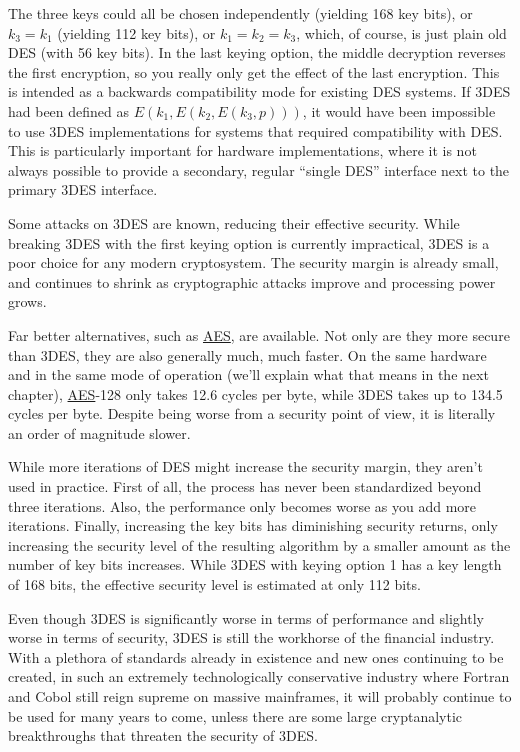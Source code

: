 \documentclass[11pt,ebook,table,dvipsnames]{memoir}
\begin{document}
The three keys could all be chosen independently (yielding 168 key
bits), or $k_3 = k_1$ (yielding 112 key bits), or $k_1 = k_2 = k_3$,
which, of course, is just plain old DES (with 56 key bits). In the
last keying option, the middle decryption reverses the first
encryption, so you really only get the effect of the last encryption.
This is intended as a backwards compatibility mode for existing DES
systems. If 3DES had been defined as $E(k_1, E(k_2, E(k_3, p)))$, it
would have been impossible to use 3DES implementations for systems
that required compatibility with DES. This is particularly important
for hardware implementations, where it is not always possible to
provide a secondary, regular \enquote{single DES} interface next to the
primary 3DES interface.

Some attacks on 3DES are known, reducing their effective security.
While breaking 3DES with the first keying option is currently
impractical, 3DES is a poor choice for any modern cryptosystem. The
security margin is already small, and continues to shrink as
cryptographic attacks improve and processing power grows.

Far better alternatives, such as \hyperref[AES]{AES}, are available. Not only are they
more secure than 3DES, they are also generally much, much faster. On
the same hardware and in the same \gls{mode of operation} (we'll
explain what that means in the next chapter), \hyperref[AES]{AES}-128 only takes 12.6
cycles per byte, while 3DES takes up to 134.5 cycles per byte.
\cite{cryptopp:bench} Despite being worse from a security point of
view, it is literally an order of magnitude slower.

While more iterations of DES might increase the security margin, they
aren't used in practice. First of all, the process has never been
standardized beyond three iterations. Also, the performance only
becomes worse as you add more iterations. Finally, increasing the key
bits has diminishing security returns, only increasing the security
level of the resulting algorithm by a smaller amount as the number of
key bits increases. While 3DES with keying option 1 has a key length
of 168 bits, the effective security level is estimated at only 112
bits.

Even though 3DES is significantly worse in terms of performance and
slightly worse in terms of security, 3DES is still the workhorse of
the financial industry. With a plethora of standards already in
existence and new ones continuing to be created, in such an extremely
technologically conservative industry where Fortran and Cobol still
reign supreme on massive mainframes, it will probably continue to be
used for many years to come, unless there are some large cryptanalytic
breakthroughs that threaten the security of 3DES.
\end{document}
